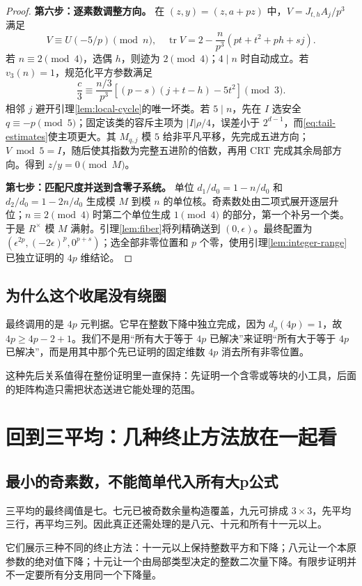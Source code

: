 \documentclass[11pt,a4paper,oneside,openany]{book}
\theoremstyle{definition}
\numberwithin{equation}{chapter}
\begin{document}
\begin{proof}
\par\noindent\textbf{第六步：逐素数调整方向。}
在 $(z,y)=(z,a+pz)$ 中，$V=J_{t,h}A_j/p^3$ 满足
\[
V\equiv U(-5/p)\pmod n,\quad
\operatorname{tr}V=2-\frac n{p^3}(pt+t^2+ph+sj).
\]
若 $n\equiv2\pmod4$，选偶 $h$，则迹为 $2\pmod4$；$4\mid n$ 时自动成立。若 $v_3(n)=1$，规范化平方参数满足
\[
\frac c3\equiv\frac{n/3}{p^3}[(p-s)(j+t-h)-5t^2]\pmod3.
\]
相邻 $j$ 避开引理\ref{lem:local-cycle}的唯一坏类。若 $5\mid n$，先在 $I$ 选安全 $q\equiv-p\pmod5$；固定该类的容斥主项为 $|I|\rho/4$，误差小于 $2^{d-1}$，而\eqref{eq:tail-estimates}使主项更大。其 $M_{q,j}$ 模 $5$ 给非平凡平移，先完成五进方向；$V\bmod5=I$，随后使其指数为完整五进阶的倍数，再用 CRT 完成其余局部方向。得到 $z/y=0\pmod M$。

\par\noindent\textbf{第七步：匹配尺度并送到含零子系统。}
单位 $d_1/d_0=1-n/d_0$ 和 $d_2/d_0=1-2n/d_0$ 生成模 $M$ 到模 $n$ 的单位核。奇素数处由二项式展开逐层升位；$n\equiv2\pmod4$ 时第二个单位生成 $1\pmod4$ 的部分，第一个补另一个类。于是 $R^\times$ 模 $M$ 满射。引理\ref{lem:fiber}将列精确送到 $(0,\epsilon)$。最终配置为 $(\epsilon^{2p},(-2\epsilon)^p,0^{p+s})$；选全部非零位置和 $p$ 个零，使用引理\ref{lem:integer-range}已独立证明的 $4p$ 维结论。
\end{proof}

\section{为什么这个收尾没有绕圈}
最终调用的是 $4p$ 元判据。它早在整数下降中独立完成，因为 $d_p(4p)=1$，故 $4p\ge4p-2+1$。我们不是用“所有大于等于 $4p$ 已解决”来证明“所有大于等于 $4p$ 已解决”，而是用其中那个先已证明的固定维数 $4p$ 消去所有非零位置。

这种先后关系值得在整份证明里一直保持：先证明一个含零或等块的小工具，后面的矩阵构造只需把状态送进它能处理的范围。

\chapter{回到三平均：几种终止方法放在一起看}\label{ch:three}
\section{最小的奇素数，不能简单代入所有大p公式}
三平均的最终阈值是七。七元已被奇数余量构造覆盖，九元可排成 $3\times3$，先平均三行，再平均三列。因此真正还需处理的是八元、十元和所有十一元以上。

它们展示三种不同的终止方法：十一元以上保持整数平方和下降；八元让一个本原参数的绝对值下降；十元让一个由局部类型决定的整数二次量下降。有限步证明并不一定要所有分支用同一个下降量。
\end{document}
